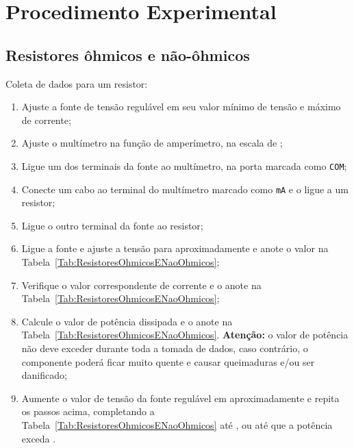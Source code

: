 \section{Procedimento Experimental}

\subsection{Resistores ôhmicos e não-ôhmicos}

Coleta de dados para um resistor:
\begin{enumerate}
	\item Ajuste a fonte de tensão regulável em seu valor mínimo de tensão e máximo de corrente; 
	\item Ajuste o multímetro na função de amperímetro, na escala de ;
	\item Ligue um dos terminais da fonte ao multímetro, na porta marcada como \texttt{COM};
	\item Conecte um cabo ao terminal do multímetro marcado como \texttt{mA} e o ligue a um resistor;
	\item Ligue o outro terminal da fonte ao resistor;
	\item Ligue a fonte e ajuste a tensão para aproximadamente  e anote o valor na Tabela~\ref{Tab:ResistoresOhmicosENaoOhmicos};
	\item Verifique o valor correspondente de corrente e o anote na Tabela~\ref{Tab:ResistoresOhmicosENaoOhmicos};
	\item Calcule o valor de potência dissipada e o anote na Tabela~\ref{Tab:ResistoresOhmicosENaoOhmicos}. \textbf{Atenção:} o valor de potência não deve exceder  durante toda a tomada de dados, caso contrário, o componente poderá ficar muito quente e causar queimaduras e/ou ser danificado;
	\item Aumente o valor de tensão da fonte regulável em aproximadamente  e repita os passos acima, completando a Tabela~\ref{Tab:ResistoresOhmicosENaoOhmicos} até , ou até que a potência exceda . 
\end{enumerate}

